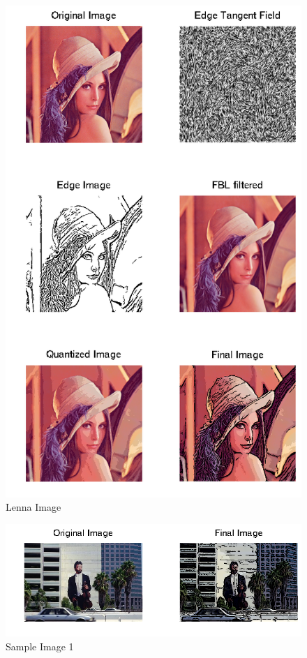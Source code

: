 \documentclass[a4paper]{article}
\begin{document}
\begin{figure}
\centering
\includegraphics[width=1\textwidth]{lenna_final.png}
\caption{Lenna Image}
\end{figure}

\begin{figure}
\centering
\includegraphics[width=1\textwidth]{119082_final.png}
\caption{Sample Image 1}
\end{figure}
\end{document}
